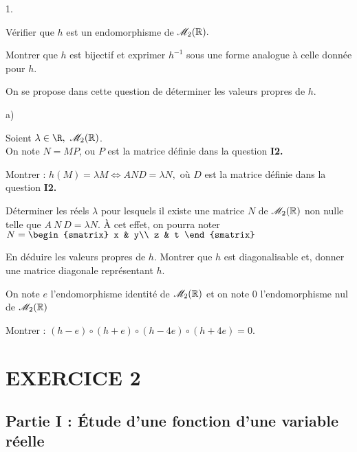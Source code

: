 \documentclass[11pt]{article}%
\begin{document}
\begin{noliste}{1.}
 \setlength{\itemsep}{4mm}
\item Vérifier que $h$ est un endomorphisme de $\mathscr{M}_{2}(\mathbb{R}).$

\item Montrer que $h$ est bijectif et exprimer $h^{-1}$ sous une forme
analogue à celle donnée pour $h$.

\item On se propose dans cette question de déterminer les valeurs
propres
de $h$.

\begin{noliste}{a)}
 \setlength{\itemsep}{2mm}
\item Soient $\lambda\in\R,\mathbb{\ }\M{2} $.\\
 On note $N = MP$, ou $P$ est la matrice
définie dans la question \textbf{I2.}

Montrer : $h\left( M\right) = \lambda M\Longleftrightarrow AND =
\lambda N,$
où $D$ est la matrice définie dans la question \textbf{I2.}

\item Déterminer les réels $\lambda$ pour lesquels il existe une
matrice $N$ de $\mathscr{M}_{2}(\mathbb{R}) $ non nulle telle
que $A~N~D = \lambda N.$ \`{A} cet effet, on pourra noter $N = 
\begin{smatrix}
x & y\\
z & t
\end{smatrix}
$

\item En déduire les valeurs propres de $h$. Montrer que $h$ est
diagonalisable et, donner une matrice diagonale représentant $h$.

\item On note $e$ l'endomorphisme identité de $\mathscr{M}_{2}(\mathbb{R}) $ et on note $0$
l'endomorphisme nul de $\mathscr{M}_{2}(\mathbb{R}) $

Montrer : $\left( h-e\right) \circ\left( h + e\right) \circ\left(
h-4e\right) \circ\left( h + 4e\right) = 0$.
\end{noliste}
\end{noliste}

\section*{EXERCICE 2}

\subsection*{Partie I : Étude d'une fonction d'une variable réelle}
\end{document}
